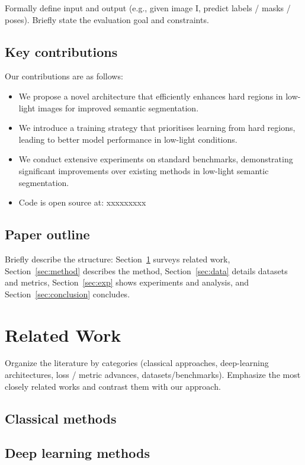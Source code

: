 \documentclass[journal]{IEEEtran}
\begin{document}
Formally define input and output (e.g., given image I, predict labels / masks / poses). Briefly state the evaluation goal and constraints.

\subsection{Key contributions}
Our contributions are as follows:

\begin{itemize}
    \item We propose a novel architecture that efficiently enhances hard regions in low-light images for improved semantic segmentation.
    \item We introduce a training strategy that prioritises learning from hard regions, leading to better model performance in low-light conditions.
    \item We conduct extensive experiments on standard benchmarks, demonstrating significant improvements over existing methods in low-light semantic segmentation.
    \item Code is open source at: xxxxxxxxx
\end{itemize}

\subsection{Paper outline}
Briefly describe the structure: Section~\ref{sec:related} surveys related work, Section~\ref{sec:method} describes the method, Section~\ref{sec:data} details datasets and metrics, Section~\ref{sec:exp} shows experiments and analysis, and Section~\ref{sec:conclusion} concludes.

\section{Related Work}
\label{sec:related}
Organize the literature by categories (classical approaches, deep-learning architectures, loss / metric advances, datasets/benchmarks). Emphasize the most closely related works and contrast them with our approach.

\subsection{Classical methods}

\subsection{Deep learning methods}
\end{document}
